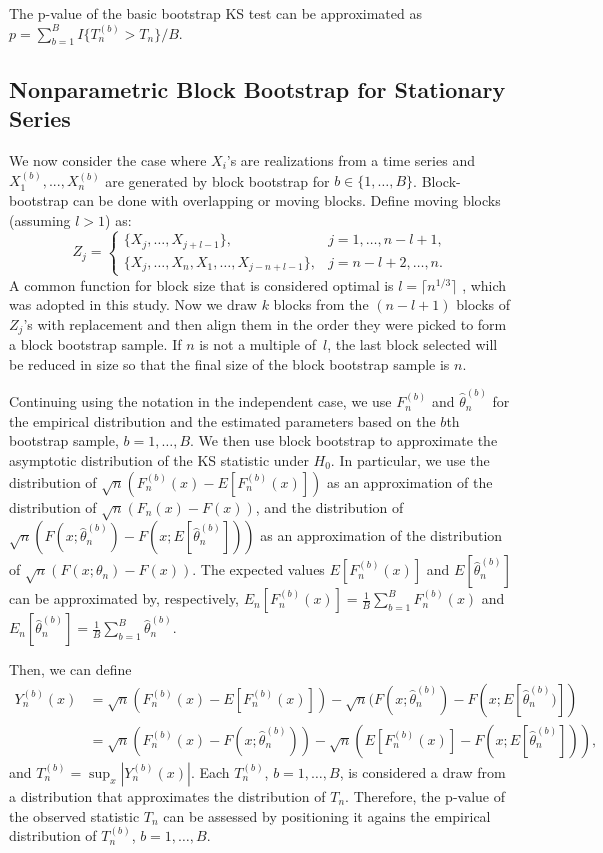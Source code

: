 \documentclass[12pt, titlepage, letterpaper]{article}
\begin{document}
The p-value of the basic bootstrap KS test can be approximated
as $p = \sum_{b=1}^B I\{T^{(b)}_n > T_n\} / B$.


\subsection{Nonparametric Block Bootstrap for Stationary Series}

We now consider the case where $X_i$'s are realizations from a time series and
$X^{(b)}_1,...,X^{(b)}_n$ are generated by block bootstrap for 
$b \in \{1, \ldots, B\}$.  
Block-bootstrap can be done with overlapping or moving blocks.
Define moving blocks (assuming $l > 1$) as:
\begin{equation*}
Z_j =
    \begin{cases}
        \{X_j, \ldots, X_{j + l - 1}\}, & j = 1, \dots, n - l + 1,\\
        \{X_j, \ldots, X_n, X_1, \ldots, X_{j-n+l-1}\}, & j = n - l
        + 2 ,\dots, n.
    \end{cases}
\end{equation*}
A common 
function for block size that is considered optimal is 
$l = \lceil n^{1/3} \rceil$ \citep{buhlmann1999block},  
which was adopted in this study.
Now we draw $k$ blocks from the $(n - l + 1)$ blocks 
of $Z_j$'s with replacement and then align them in the order they were picked to
form a block bootstrap sample. If $n$ is not a multiple of~$l$, the last block 
selected will be reduced in size so that the final size of the block bootstrap 
sample is $n$.


Continuing using the notation in the independent case,
we use $F^{(b)}_n$ and $\hat\theta^{(b)}_n$ for the empirical distribution and
the estimated parameters based on the $b$th bootstrap sample,
$b = 1, \ldots, B$.
We then use block bootstrap to approximate the asymptotic distribution of
the KS statistic under $H_0$. In particular, we
use the distribution of $\sqrt{n}(F^{(b)}_n(x) - E[F^{(b)}_n(x)])$
as an approximation of the distribution of
$\sqrt{n}(F_n(x) - F(x))$, and the distribution of 
$\sqrt{n}(F(x; \hat\theta^{(b)}_n) - F(x; E[\hat\theta^{(b)}_n]))$ as
an approximation of the distribution of $\sqrt{n}(F(x; \theta_n) - F(x))$.
The expected values $E[F^{(b)}_n(x)]$ and
$E[\hat\theta^{(b)}_n]$ can be approximated by, respectively,
$E_n[F^{(b)}_n(x)] = \frac{1}{B}\sum_{b = 1}^BF^{(b)}_n(x)$ and
$E_n[\hat\theta^{(b)}_n]  =  \frac{1}{B}\sum_{b = 1}^B\hat\theta^{(b)}_n$.


Then, we can define
\begin{align*}
  Y^{(b)}_n(x) &= \sqrt{n}(F^{(b)}_n(x) - E[F^{(b)}_n(x)]) - 
             \sqrt{n}(F(x; \hat\theta^{(b)}_n) - F(x; E[\hat\theta^{(b)}_n)]) \\
           &= \sqrt{n}(F^{(b)}_n(x) - F(x; \hat\theta^{(b)}_n)) -
             \sqrt{n}(E[F^{(b)}_n(x)] - F(x; E[\hat\theta^{(b)}_n])),
\end{align*}
and $T^{(b)}_n = \sup_x|Y^{(b)}_n(x)|$. Each $T_n^{(b)}$,
$b =1, \ldots, B$, is considered a draw from a distribution that approximates
the distribution of $T_n$. Therefore, the p-value of the observed statistic
$T_n$ can be assessed by positioning it agains the empirical distribution of
$T_n^{(b)}$, $b = 1, \ldots, B$.
\end{document}
